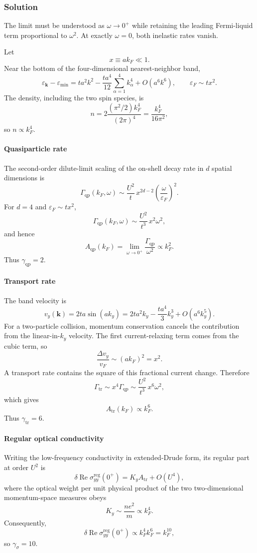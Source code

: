 {\color{blue}
\subsubsection*{Solution}

{\color{blue}
The limit must be understood as $\omega\to0^+$ while retaining the leading Fermi-liquid term proportional to $\omega^2$. At exactly $\omega=0$, both inelastic rates vanish.

Let
\[
x\equiv ak_F\ll1.
\]
Near the bottom of the four-dimensional nearest-neighbor band,
\[
\varepsilon_{\mathbf k}-\varepsilon_{\min}
 =ta^2k^2-\frac{ta^4}{12}\sum_{\alpha=1}^{4}k_\alpha^4+O(a^6k^6),
\qquad
\varepsilon_F\sim t x^2.
\]
The density, including the two spin species, is
\[
n=2\frac{(\pi^2/2)k_F^4}{(2\pi)^4}
 =\frac{k_F^4}{16\pi^2},
\]
so $n\propto k_F^4$.

\paragraph*{Quasiparticle rate}
The second-order dilute-limit scaling of the on-shell decay rate in $d$ spatial dimensions is
\[
\Gamma_{\mathrm{qp}}(k_F,\omega)
 \sim \frac{U^2}{t}\,x^{2d-2}
       \left(\frac{\omega}{\varepsilon_F}\right)^2.
\]
For $d=4$ and $\varepsilon_F\sim tx^2$,
\[
\Gamma_{\mathrm{qp}}(k_F,\omega)
 \sim \frac{U^2}{t^3}\,x^2\omega^2,
\]
and hence
\[
A_{\mathrm{qp}}(k_F)
 =\lim_{\omega\to0^+}\frac{\Gamma_{\mathrm{qp}}}{\omega^2}
 \propto k_F^2.
\]
Thus $\gamma_{\mathrm{qp}}=2$.

\paragraph*{Transport rate}
The band velocity is
\[
v_y(\mathbf k)=2ta\sin(ak_y)
 =2ta^2k_y-\frac{ta^4}{3}k_y^3+O(a^6k_y^5).
\]
For a two-particle collision, momentum conservation cancels the contribution from the linear-in-$k_y$ velocity. The first current-relaxing term comes from the cubic term, so
\[
\frac{\Delta v_y}{v_F}\sim (ak_F)^2=x^2.
\]
A transport rate contains the square of this fractional current change. Therefore
\[
\Gamma_{\mathrm{tr}}\sim x^4\Gamma_{\mathrm{qp}}
 \sim \frac{U^2}{t^3}\,x^6\omega^2,
\]
which gives
\[
A_{\mathrm{tr}}(k_F)\propto k_F^6.
\]
Thus $\gamma_{\mathrm{tr}}=6$.

\paragraph*{Regular optical conductivity}
Writing the low-frequency conductivity in extended-Drude form, its regular part at order $U^2$ is
\[
\delta\operatorname{Re}\sigma^{\mathrm{reg}}_{yy}(0^+)
 =K_y A_{\mathrm{tr}}+O(U^4),
\]
where the optical weight per unit physical product of the two two-dimensional momentum-space measures obeys
\[
K_y\sim\frac{ne^2}{m}\propto k_F^4.
\]
Consequently,
\[
\delta\operatorname{Re}\sigma^{\mathrm{reg}}_{yy}(0^+)
 \propto k_F^4k_F^6=k_F^{10},
\]
so $\gamma_\sigma=10$.

}}

